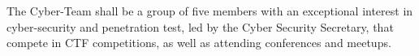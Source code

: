  The Cyber-Team shall be a group of five members with an exceptional interest in cyber-security and penetration test, led by the Cyber Security Secretary, that compete in CTF competitions, as well as attending conferences and meetups.
